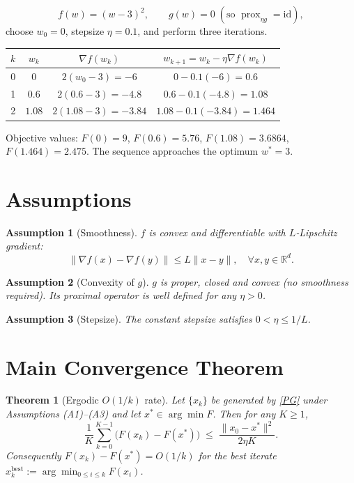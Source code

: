 \documentclass{article}
\newtheorem{theorem}{Theorem}
\newtheorem{assumption}{Assumption}
\newcommand{\prox}{\operatorname{prox}}
\newcommand{\R}{\mathbb{R}}
\begin{document}
\[
f(w)=(w-3)^{2},\qquad g(w)=0\;( \text{so }\prox_{\eta g}= \text{id}),
\]
choose $w_{0}=0$, stepsize $\eta=0.1$, and perform three iterations.

\begin{center}
\begin{tabular}{c|c|c|c}
$k$ & $w_{k}$ & $\nabla f(w_{k})$ & $w_{k+1}=w_{k}-\eta\nabla f(w_{k})$\\\hline
0 & $0$ & $2(w_{0}-3)=-6$ & $0-0.1(-6)=0.6$\\
1 & $0.6$ & $2(0.6-3)=-4.8$ & $0.6-0.1(-4.8)=1.08$\\
2 & $1.08$ & $2(1.08-3)=-3.84$ & $1.08-0.1(-3.84)=1.464$\\
\end{tabular}
\end{center}
Objective values: $F(0)=9$, $F(0.6)=5.76$, $F(1.08)=3.6864$, $F(1.464)=2.475$. The sequence approaches the optimum $w^{*}=3$.

\newpage
\section*{Assumptions}
\begin{assumption}[Smoothness]
$f$ is convex and differentiable with $L$‑Lipschitz gradient:
\[
\|\nabla f(x)-\nabla f(y)\|\le L\|x-y\|,\quad\forall x,y\in\R^{d}.
\tag{A1}
\]
\end{assumption}
\begin{assumption}[Convexity of $g$]
$g$ is proper, closed and convex (no smoothness required). Its proximal operator is well defined for any $\eta>0$.
\end{assumption}
\begin{assumption}[Stepsize]
The constant stepsize satisfies $0<\eta\le 1/L$.
\end{assumption}

\section*{Main Convergence Theorem}
\begin{theorem}[Ergodic $O(1/k)$ rate]\label{thm:rate}
Let $\{x_{k}\}$ be generated by \eqref{PG} under Assumptions (A1)–(A3) and let $x^{*}\in\arg\min F$. Then for any $K\ge1$,
\[
\frac{1}{K}\sum_{k=0}^{K-1} \bigl(F(x_{k})-F(x^{*})\bigr)
\;\le\;
\frac{\|x_{0}-x^{*}\|^{2}}{2\eta K}.
\tag{T1}
\]
Consequently $F(x_{k})-F(x^{*})=O(1/k)$ for the best iterate $x_{k}^{\text{best}}:=\arg\min_{0\le i\le k}F(x_{i})$.
\end{theorem}
\end{document}
